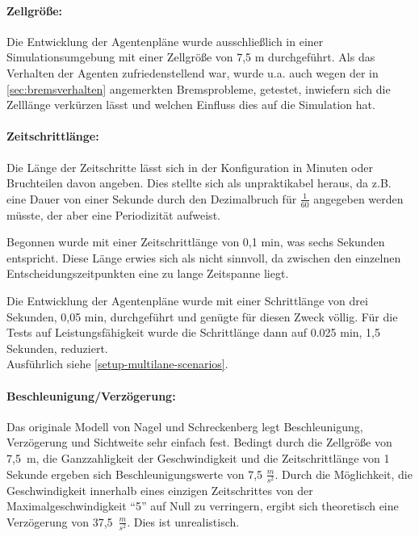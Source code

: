 \paragraph*{Zellgröße:}
\label{zellgroesse-zeitschritte}
Die Entwicklung der Agentenpläne wurde ausschließlich in einer Simulationsumgebung mit einer Zellgröße von 7,5 m durchgeführt.
Als das Verhalten der Agenten zufriedenstellend war, wurde u.a. auch wegen der in \cref{sec:bremsverhalten} angemerkten Bremsprobleme, getestet, inwiefern sich die Zelllänge verkürzen lässt und welchen Einfluss dies auf die Simulation hat.


\paragraph*{Zeitschrittlänge:}
Die Länge der Zeitschritte lässt sich in der Konfiguration in Minuten oder Bruchteilen davon angeben. 
Dies stellte sich als unpraktikabel heraus, da z.B. eine Dauer von einer Sekunde durch den Dezimalbruch für $\frac{1}{60}$ angegeben werden müsste, der aber eine Periodizität aufweist.

Begonnen wurde mit einer Zeitschrittlänge von 0,1 min, was sechs Sekunden entspricht. 
Diese Länge erwies sich als nicht sinnvoll, da zwischen den einzelnen Entscheidungszeitpunkten eine zu lange Zeitspanne liegt.

Die Entwicklung der Agentenpläne wurde mit einer Schrittlänge von drei Sekunden, 0,05 min, durchgeführt und genügte für diesen Zweck völlig.
Für die Tests auf Leistungsfähigkeit wurde die Schrittlänge dann auf 0.025 min, 1,5 Sekunden, reduziert.
\\
Ausführlich siehe \cref{setup-multilane-scenarios}.



\paragraph*{Beschleunigung/Verzögerung:}
\label{beschl-verz}
Das originale Modell von Nagel und Schreckenberg legt Beschleunigung, Verzögerung und Sichtweite sehr einfach fest.
Bedingt durch die Zellgröße von \mbox{7,5 m}, die Ganzzahligkeit der Geschwindigkeit und die Zeitschrittlänge von 1 Sekunde ergeben sich Beschleunigungswerte von 7,5 $\frac{m}{s^{2}}$. 
Durch die Möglichkeit, die Geschwindigkeit innerhalb eines einzigen Zeitschrittes von der Maximalgeschwindigkeit \enquote{5} auf Null zu verringern, ergibt sich theoretisch eine Verzögerung von \mbox{37,5 $\frac{m}{s^{2}}$}.
Dies ist unrealistisch.

